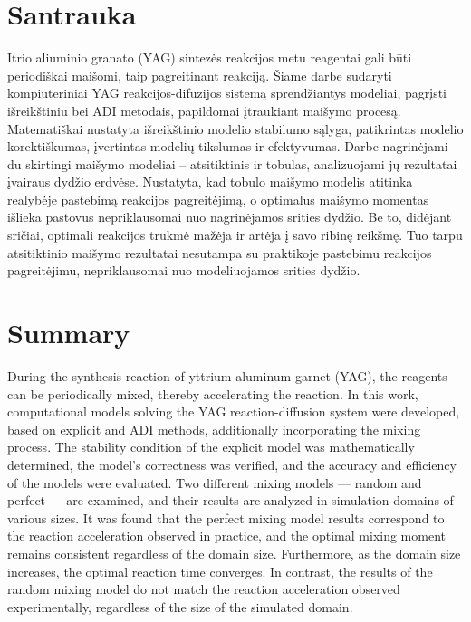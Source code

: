 \section*{Santrauka}

Itrio aliuminio granato (YAG) sintezės reakcijos metu reagentai gali būti periodiškai maišomi, taip pagreitinant reakciją. Šiame darbe sudaryti kompiuteriniai YAG reakcijos-difuzijos sistemą sprendžiantys modeliai, pagrįsti išreikštiniu bei ADI metodais, papildomai įtraukiant maišymo procesą. Matematiškai nustatyta išreikštinio modelio stabilumo sąlyga, patikrintas modelio korektiškumas, įvertintas modelių tikslumas ir efektyvumas. Darbe nagrinėjami du skirtingi maišymo modeliai -- atsitiktinis ir tobulas, analizuojami jų rezultatai įvairaus dydžio erdvėse. Nustatyta, kad tobulo maišymo modelis atitinka realybėje pastebimą reakcijos pagreitėjimą, o optimalus maišymo momentas išlieka pastovus nepriklausomai nuo nagrinėjamos srities dydžio. Be to, didėjant sričiai, optimali reakcijos trukmė mažėja ir artėja į savo ribinę reikšmę. Tuo tarpu atsitiktinio maišymo rezultatai nesutampa su praktikoje pastebimu reakcijos pagreitėjimu, nepriklausomai nuo modeliuojamos srities dydžio.

\newpage 

\section*{Summary}

During the synthesis reaction of yttrium aluminum garnet (YAG), the reagents can be periodically mixed, thereby accelerating the reaction. In this work, computational models solving the YAG reaction-diffusion system were developed, based on explicit and ADI methods, additionally incorporating the mixing process. The stability condition of the explicit model was mathematically determined, the model's correctness was verified, and the accuracy and efficiency of the models were evaluated. Two different mixing models — random and perfect — are examined, and their results are analyzed in simulation domains of various sizes. It was found that the perfect mixing model results correspond to the reaction acceleration observed in practice, and the optimal mixing moment remains consistent regardless of the domain size. Furthermore, as the domain size increases, the optimal reaction time converges. In contrast, the results of the random mixing model do not match the reaction acceleration observed experimentally, regardless of the size of the simulated domain.

\newpage 

